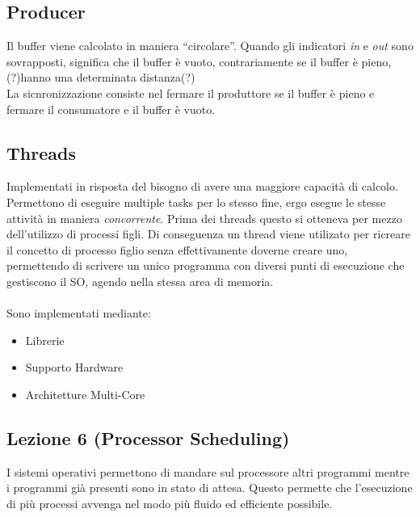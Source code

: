 \documentclass[12pt, a4paper]{article}
\begin{document}
	\subsection*{Producer} 
	Il buffer viene calcolato in maniera ``circolare''. Quando gli indicatori \textit{in} e \textit{out} sono sovrapposti, significa che il buffer è vuoto, contrariamente se il buffer è pieno, (?)hanno una determinata distanza(?) \\
	La sicnronizzazione consiste nel fermare il produttore se il buffer è pieno e fermare il consumatore e il buffer è vuoto. \\
	
	
	\subsection*{Threads}
	Implementati in risposta del bisogno di avere una maggiore capacità di calcolo. Permettono di eseguire multiple tasks per lo stesso fine, ergo esegue le stesse attività in maniera \textit{concorrente}. Prima dei threads questo si otteneva per mezzo dell'utilizzo di processi figli. Di conseguenza un thread viene utilizato per ricreare il concetto di processo figlio senza effettivamente doverne creare uno, permettendo di scrivere un unico programma con diversi punti di esecuzione che gestiscono il SO, agendo nella stessa area di memoria. \\ \\
	Sono implementati mediante:
	\begin{itemize}
		\item Librerie
		\item Supporto Hardware
		\item Architetture Multi-Core
	\end{itemize}
		
	\subsection*{Lezione 6 (Processor Scheduling)}
	
	I sistemi operativi permettono di mandare sul processore altri programmi mentre i programmi già presenti sono in stato di attesa. Questo permette che l'esecuzione di più processi avvenga nel modo più fluido ed efficiente possibile. \\ 
	
\end{document}
